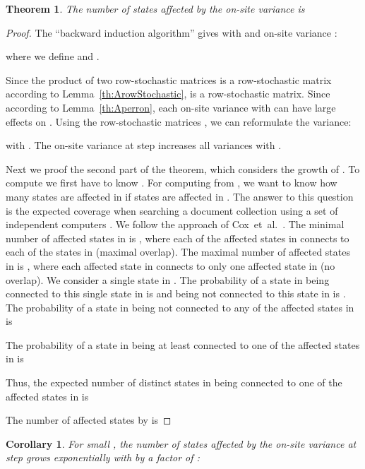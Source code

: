 \documentclass{article}
\newtheorem{theoremA}{Theorem}
\newtheorem{corollaryA}{Corollary}\newtheorem{propositionA}{Proposition}\newtheorem{lemmaA}{Lemma}\newtheorem{conjectureA}{Conjecture}
\begin{document}
\begin{appendices}
\begin{theoremA}
The number  of states affected by the on-site variance
 is

\end{theoremA}



\begin{proof}
The ``backward induction algorithm'' \cite{Puterman:90,Puterman:05}
gives with  and on-site variance :

where we define  and .

Since the product of two row-stochastic matrices is a row-stochastic
matrix according to Lemma~\ref{th:ArowStochastic},
 is a row-stochastic matrix.
Since  according to Lemma~\ref{th:Aperron},
each on-site variance  with  can have large effects on
.
Using the row-stochastic matrices , we can
reformulate the variance:

with .
The on-site variance  at step 
increases all variances  with .

Next we proof the second part of the theorem, which considers the
growth of .
To compute  we first have
to know . For computing  from , we want to know how
many states are affected in  if 
states are affected in .
The answer to this question is the expected
coverage when searching a document collection
using a set of independent computers \cite{Cox:09}.  
We follow the approach of Cox~et~al.\ \cite{Cox:09}.
The minimal number of affected states in  is , where
each of the  affected states in  
connects to each of the  states in  (maximal overlap).
The maximal number of affected states in  is
, where each affected state in 
connects to only one affected state in  (no overlap).
We consider a single state in .
The probability of a state in  being connected to this single
state in  is  and being not connected to this state in
 is .
The probability of a state in 
being not connected to any of the  affected states in  is

The probability of a state in 
being at least connected to one of the  affected states in  is

Thus, the expected number of distinct states in  being
connected to one of the  affected states in  is

The number  of affected states by  is

\end{proof}

\begin{corollaryA}
\label{th:Acoro}
 For small , the number  of states affected by
the on-site variance  at step 
grows exponentially with  by a factor of : 


\end{corollaryA}
\end{appendices}
\end{document}
